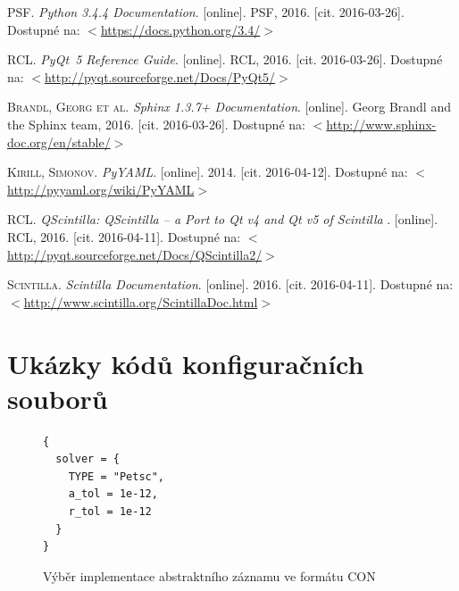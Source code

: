 \documentclass[FM,bw,DP]{tulthesis}
\begin{document}
\begin{thebibliography}{99}
\acrshort{PSF}. \textit{Python 3.4.4 Documentation}. [online]. \acrfull{PSF}, 2016. [cit. 2016-03-26]. Dostupné na: $<$\url{https://docs.python.org/3.4/}$>$

\textsc{\acrshort{RCL}.} \textit{PyQt~5 Reference Guide}. [online]. \acrfull{RCL}, 2016. [cit. 2016-03-26]. Dostupné na: $<$\url{http://pyqt.sourceforge.net/Docs/PyQt5/}$>$

\textsc{Brandl, Georg et al.} \textit{Sphinx 1.3.7+ Documentation}. [online]. Georg Brandl and the Sphinx team, 2016. [cit. 2016-03-26]. Dostupné na: $<$\url{http://www.sphinx-doc.org/en/stable/}$>$

\textsc{Kirill, Simonov.} \textit{PyYAML}. [online]. 2014. [cit. 2016-04-12]. Dostupné na: $<$\url{http://pyyaml.org/wiki/PyYAML}$>$

\textsc{\acrshort{RCL}}. \textit{QScintilla: QScintilla -- a Port to Qt v4 and Qt v5 of Scintilla }. [online]. \acrfull{RCL}, 2016. [cit. 2016-04-11]. Dostupné na: $<$\url{http://pyqt.sourceforge.net/Docs/QScintilla2/}$>$

\textsc{Scintilla}. \textit{Scintilla Documentation}. [online]. 2016. [cit. 2016-04-11]. Dostupné na: $<$\url{http://www.scintilla.org/ScintillaDoc.html}$>$



\end{thebibliography}



\appendix



\chapter{Ukázky kódů konfiguračních souborů}

\lstset{style=code}

\begin{figure}[h]
\begin{lstlisting}
{
  solver = {
    TYPE = "Petsc",
    a_tol = 1e-12,
    r_tol = 1e-12
  }
}
\end{lstlisting}
\vspace*{-20pt}
\caption{Výběr implementace abstraktního záznamu ve formátu CON}
\label{img:abstract-record-con}
\end{figure}
\end{document}
